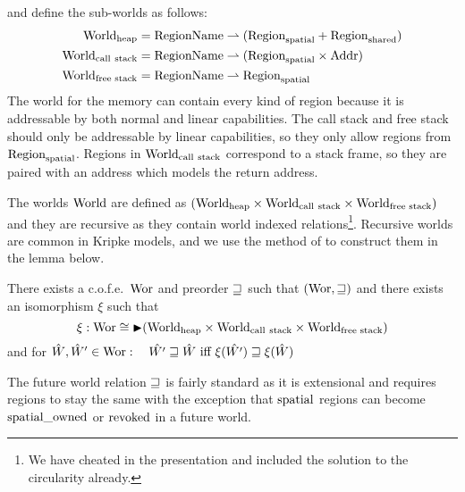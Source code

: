 \documentclass[acmsmall,review,anonymous]{acmart}\settopmatter{printfolios=true,printccs=false,printacmref=false}
\renewcommand{\Worlds}{\World_{\mathrm{call\ stack}}}
\begin{document}
and define the sub-worlds as follows:
\begin{align*}
  \Worldh  &={} \RegionName \parfun (\Regions + \Regionh)\\
  \Worlds  &={} \RegionName \parfun (\Regions \times \Addr)\\
  \Worldfs &={} \RegionName \parfun \Regions
\end{align*}
The world for the memory can contain every kind of region because it is addressable by both normal and linear capabilities.
The call stack and free stack should only be addressable by linear capabilities, so they only allow regions from $\mathrm{Region}_\mathrm{spatial}$.
Regions in $\Worlds$ correspond to a stack frame, so they are paired with an address which models the return address.

The worlds $\mathrm{World}$ are defined as $(\Worldh \times \Worlds \times \Worldfs)$ and they are recursive as they contain world indexed relations\footnote{We have cheated in the presentation and included the solution to the circularity already.}. Recursive worlds are common in Kripke models, and we use the method of \citet{Birkedal:2011:SKM:1926385.1926401,Birkedal_taste_2014} to construct them in the lemma below.
\begin{lemma}
  \label{thm:recursive-domain-eq}
  There exists a c.o.f.e.\ $\mathrm{Wor}$ and preorder $\sqsupseteq$ such that $(\mathrm{Wor},\sqsupseteq)$ and there exists an isomorphism $\xi$ such that
  \[
    \xi : \Wor \cong \blater (\Worldh \times \Worlds \times \Worldfs)
  \]
  and for $\hat{W},\hat{W}' \in \mathrm{Wor}: \quad  \hat{W'} \sqsupseteq \hat{W}\text{ iff }\xi(\hat{W'}) \sqsupseteq \xi(\hat{W})$
\end{lemma}
The future world relation $\sqsupseteq$ is fairly standard as it is extensional and requires regions to stay the same with the exception that $\mathrm{spatial}$ regions can become $\mathrm{spatial\_owned}$ or $\mathrm{revoked}$ in a future world.
\end{document}
